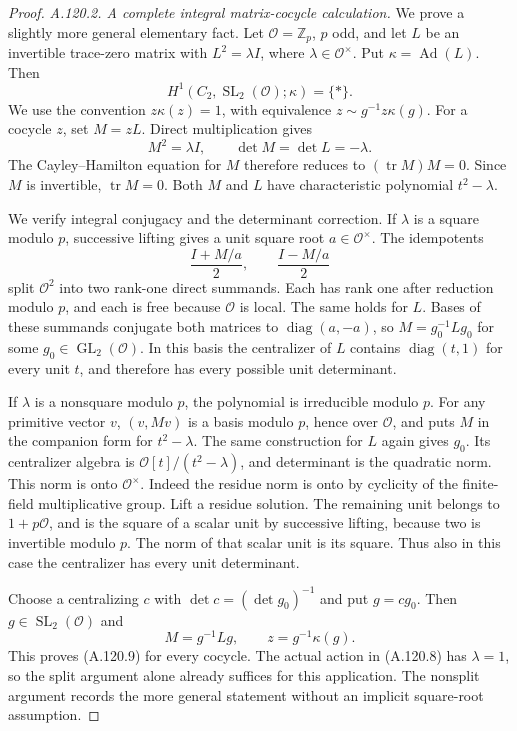 \begin{proof}
\emph{A.120.2. A complete integral matrix-cocycle calculation.}
We prove a slightly more general elementary fact.
Let \(\mathcal O=\mathbb Z_p\), \(p\) odd, and let \(L\) be an invertible
trace-zero matrix with \(L^2=\lambda I\), where
\(\lambda\in\mathcal O^\times\). Put \(\kappa=\operatorname{Ad}(L)\).
Then
\[
                 H^1(C_2,\operatorname{SL}_2(\mathcal O);\kappa)
                         =\{*\}.
 \tag{A.120.9}
\]
We use the convention \(z\kappa(z)=1\), with equivalence
\(z\sim g^{-1}z\kappa(g)\).
For a cocycle \(z\), set \(M=zL\). Direct multiplication gives
\[
                M^2=\lambda I,\qquad
                \det M=\det L=-\lambda .
\]
The Cayley--Hamilton equation for \(M\) therefore reduces to
\((\operatorname{tr}M)M=0\). Since \(M\) is invertible,
\(\operatorname{tr}M=0\). Both \(M\) and \(L\) have characteristic
polynomial \(t^2-\lambda\).

We verify integral conjugacy and the determinant correction.
If \(\lambda\) is a square modulo \(p\), successive lifting gives
a unit square root \(a\in\mathcal O^\times\).
The idempotents
\[
                   \frac{I+M/a}{2},\qquad
                   \frac{I-M/a}{2}
\]
split \(\mathcal O^2\) into two rank-one direct summands.
Each has rank one after reduction modulo \(p\), and each is free
because \(\mathcal O\) is local. The same holds for \(L\).
Bases of these summands conjugate both matrices to
\(\operatorname{diag}(a,-a)\), so
\(M=g_0^{-1}Lg_0\) for some \(g_0\in\operatorname{GL}_2(\mathcal O)\).
In this basis the centralizer of \(L\) contains
\(\operatorname{diag}(t,1)\) for every unit \(t\), and therefore
has every possible unit determinant.

If \(\lambda\) is a nonsquare modulo \(p\), the polynomial is
irreducible modulo \(p\). For any primitive vector \(v\),
\((v,Mv)\) is a basis modulo \(p\), hence over \(\mathcal O\),
and puts \(M\) in the companion form for \(t^2-\lambda\).
The same construction for \(L\) again gives \(g_0\).
Its centralizer algebra is
\(\mathcal O[t]/(t^2-\lambda)\), and determinant is the quadratic norm.
This norm is onto \(\mathcal O^\times\).
Indeed the residue norm is onto by cyclicity of the finite-field
multiplicative group. Lift a residue solution. The remaining unit
belongs to \(1+p\mathcal O\), and is the square of a scalar unit
by successive lifting, because two is invertible modulo \(p\).
The norm of that scalar unit is its square.
Thus also in this case the centralizer has every unit determinant.

Choose a centralizing \(c\) with
\(\det c=(\det g_0)^{-1}\) and put \(g=cg_0\).
Then \(g\in\operatorname{SL}_2(\mathcal O)\) and
\[
                   M=g^{-1}Lg,\qquad
                   z=g^{-1}\kappa(g).
\]
This proves (A.120.9) for every cocycle. The actual action in
(A.120.8) has \(\lambda=1\), so the split argument alone already
suffices for this application. The nonsplit argument records the
more general statement without an implicit square-root assumption.


\end{proof}
